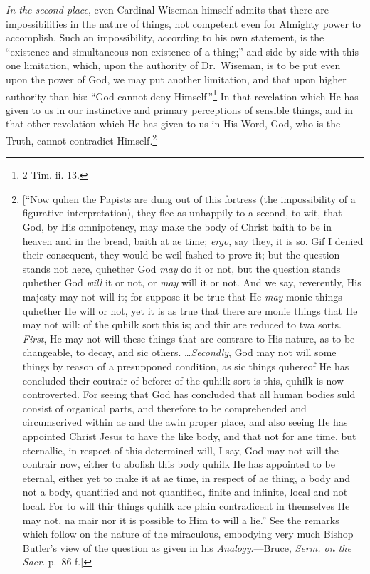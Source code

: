 \documentclass[english,]{book}
\begin{document}
\emph{In the second place}, even Cardinal Wiseman himself admits that there are impossibilities in the nature of things, not competent even for Almighty power to accomplish. Such an impossibility, according to his own statement, is the ``existence and simultaneous non-existence of a thing;'' and side by side with this one limitation, which, upon the authority of Dr.~Wiseman, is to be put even upon the power of God, we may put another limitation, and that upon higher authority than his: ``God cannot deny Himself.''\footnote{2 Tim. ii. 13.} In that revelation which He has given to us in our instinctive and primary perceptions of sensible things, and in that other revelation which He has given to us in His Word, God, who is the Truth, cannot contradict Himself.\footnote{{[}``Now quhen the Papists are dung out of this fortress (the impossibility of a figurative interpretation), they flee as unhappily to a second, to wit, that God, by His omnipotency, may make the body of Christ baith to be in heaven and in the bread, baith at ae time; \emph{ergo}, say they, it is so. Gif I denied their consequent, they would be weil fashed to prove it; but the question stands not here, quhether God \emph{may} do it or not, but the question stands quhether God \emph{will} it or not, or \emph{may} will it or not. And we say, reverently, His majesty may not will it; for suppose it be true that He \emph{may} monie things quhether He will or not, yet it is as true that there are monie things that He may not will: of the quhilk sort this is; and thir are reduced to twa sorts. \emph{First}, He may not will these things that are contrare to His nature, as to be changeable, to decay, and sic others. \ldots{}\emph{Secondly}, God may not will some things by reason of a presupponed condition, as sic things quhereof He has concluded their coutrair of before: of the quhilk sort is this, quhilk is now controverted. For seeing that God has concluded that all human bodies suld consist of organical parts, and therefore to be comprehended and circumscrived within ae and the awin proper place, and also seeing He has appointed Christ Jesus to have the like body, and that not for ane time, but eternallie, in respect of this determined will, I say, God may not will the contrair now, either to abolish this body quhilk He has appointed to be eternal, either yet to make it at ae time, in respect of ae thing, a body and not a body, quantified and not quantified, finite and infinite, local and not local. For to will thir things quhilk are plain contradicent in themselves He may not, na mair nor it is possible to Him to will a lie.'' See the remarks which follow on the nature of the miraculous, embodying very much Bishop Butler's view of the question as given in his \emph{Analogy}.---Bruce, \emph{Serm. on the Sacr}. p.~86 f.{]}}
\end{document}
